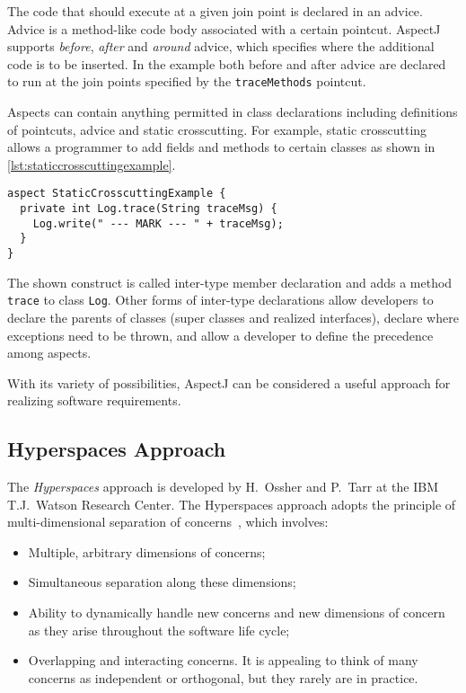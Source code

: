 The code that should execute at a given join point is declared in an advice.
Advice is a method-like code body associated with a certain pointcut.
AspectJ supports \emph{before}, \emph{after} and \emph{around} advice, which specifies where the additional code is to be inserted.
In the example both before and after advice are declared to run at the join points specified by the \lstinline|traceMethods| pointcut.

Aspects can contain anything permitted in class declarations including definitions of pointcuts, advice and static crosscutting.
For example, static crosscutting allows a programmer to add fields and methods to certain classes as shown in \autoref{lst:staticcrosscuttingexample}.

\begin{lstlisting}[language={[AspectJ]Java},style=floatlisting,%
                   caption={Example of static crosscutting in AspectJ},%
                   label={lst:staticcrosscuttingexample},floatplacement=htbp]
aspect StaticCrosscuttingExample {
  private int Log.trace(String traceMsg) {
    Log.write(" --- MARK --- " + traceMsg);
  }
}
\end{lstlisting}

The shown construct is called inter-type member declaration and adds a method \lstinline|trace| to class \lstinline|Log|.
Other forms of inter-type declarations allow developers to declare the parents of classes (super classes and realized interfaces), declare where exceptions need to be thrown, and allow a developer to define the precedence among aspects.

With its variety of possibilities, AspectJ can be considered a useful approach for realizing software requirements.

\subsection{Hyperspaces Approach}

The \emph{Hyperspaces} approach is developed by H.~Ossher and P.~Tarr at the IBM T.J.~Watson Research Center.
The Hyperspaces approach adopts the principle of multi-dimensional separation of concerns~\cite{ossher:sact01}, which involves:
\begin{itemize}[noitemsep]
  \item Multiple, arbitrary dimensions of concerns;
  \item Simultaneous separation along these dimensions;
  \item Ability to dynamically handle new concerns and new dimensions of concern as they arise throughout the software life cycle;
  \item Overlapping and interacting concerns. It is appealing to think of many concerns as independent or orthogonal, but they rarely are in practice.
\end{itemize}

